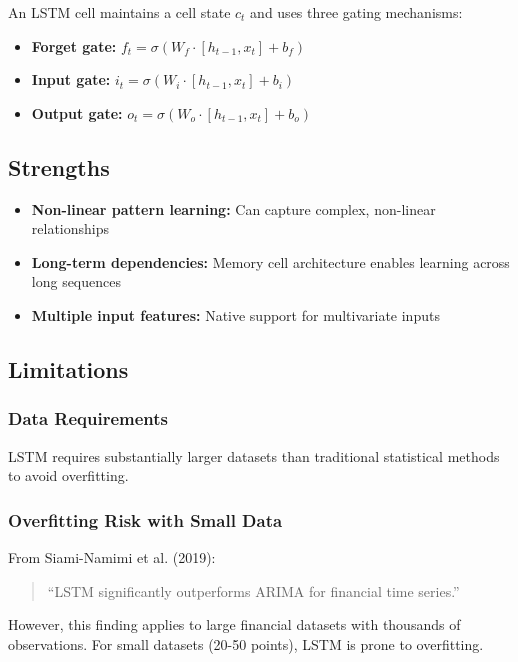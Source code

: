 \documentclass[12pt,a4paper]{article}
\begin{document}
An LSTM cell maintains a cell state $c_t$ and uses three gating mechanisms:

\begin{itemize}
    \item \textbf{Forget gate:} $f_t = \sigma(W_f \cdot [h_{t-1}, x_t] + b_f)$
    \item \textbf{Input gate:} $i_t = \sigma(W_i \cdot [h_{t-1}, x_t] + b_i)$
    \item \textbf{Output gate:} $o_t = \sigma(W_o \cdot [h_{t-1}, x_t] + b_o)$
\end{itemize}

\subsection{Strengths}

\begin{itemize}
    \item \textbf{Non-linear pattern learning:} Can capture complex, non-linear relationships
    \item \textbf{Long-term dependencies:} Memory cell architecture enables learning across long sequences
    \item \textbf{Multiple input features:} Native support for multivariate inputs
\end{itemize}

\subsection{Limitations}

\subsubsection{Data Requirements}

LSTM requires substantially larger datasets than traditional statistical methods to avoid overfitting.

\subsubsection{Overfitting Risk with Small Data}

From Siami-Namimi et al. (2019):

\begin{quote}
``LSTM significantly outperforms ARIMA for financial time series.'' \cite{siami2019comparative}
\end{quote}

However, this finding applies to large financial datasets with thousands of observations. For small datasets (20-50 points), LSTM is prone to overfitting.
\end{document}
